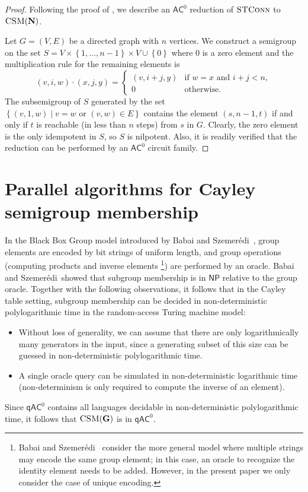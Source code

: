 \documentclass{toc}
\newcommand{\union}{\mathbin{\cup}}
\newcommand{\set}[2]{\ensuremath{\left\{#1 \mid #2\right\}}}
\newcommand{\os}[1]{\ensuremath{\left\{#1\right\}}}
\newcommand{\AC}{\ensuremath{\mathsf{AC}}}
\newcommand{\qAC}{\ensuremath{\mathsf{qAC}}}
\newcommand{\NP}{\ensuremath{\mathsf{NP}}}
\newcommand{\vNil}{\mathbf{N}}
\newcommand{\vG}{\mathbf{G}}
\newcommand{\CSM}{\ensuremath{\textsc{CSM}}}
\newcommand{\STCONN}{\ensuremath{\textsc{STConn}}}
\newcommand{\SCSM}{Cayley semigroup membership}
\newcommand{\Szemeredi}{Szemer{\'e}di}
\begin{document}
\begin{proof}
  Following the proof of , we describe an $\AC^0$
  reduction of $\STCONN$ to $\CSM(\vNil)$.

  Let $G = (V, E)$ be a directed graph with $n$ vertices.
  We construct a semigroup on the set $S = V \times \os{1, \dots, n-1} \times V
  \union \os{0}$ where $0$ is a zero element and the multiplication rule for
  the remaining elements is
  \begin{equation*}
    (v, i, w) \cdot (x, j, y) =
    \begin{cases}
      (v, i + j, y) & \text{if $w = x$ and $i + j < n$}, \\
      0 & \text{otherwise}.
    \end{cases}
  \end{equation*}
  The subsemigroup of $S$ generated by the set $\set{(v, 1, w)}{v = w
  \text{~or~} (v, w) \in E}$ contains the element $(s, n-1, t)$ if and only if
  $t$ is reachable (in less than $n$ steps) from $s$ in $G$.
  Clearly, the zero element is the only idempotent in $S$, so $S$ is nilpotent.
  Also, it is readily verified that the reduction can be performed by an
  $\AC^0$ circuit family.
\end{proof}

%
\section{Parallel algorithms for {\SCSM}}  %
\label{sec:parallel-alg}

In the Black Box Group model introduced by Babai and
\Szemeredi~\cite{BabaiS84}, %
group elements  %
are encoded by
%
bit strings of uniform length,  %
and group
operations (computing products and inverse elements%
%
\footnote{Babai and \Szemeredi~\cite{BabaiS84} consider the more general
model where multiple strings may encode the same group
element; in this case, an oracle to recognize the identity
element needs to be added.  However, in the present paper we only
consider the case of unique encoding.})  %
are performed by an
oracle. Babai and \Szemeredi\ showed that subgroup membership
is in $\NP$ relative to the group oracle.
%
Together with the following observations, it follows that in the Cayley table
setting, subgroup membership can be decided in non-deterministic
polylogarithmic time in the random-access Turing machine model:
%
\begin{itemize}
  \item Without loss of generality, we can assume that there are only
    logarithmically many generators in the input, since a generating subset
    of this size can be guessed in non-deterministic polylogarithmic time.
    
  \item A single oracle query can be simulated in non-deterministic logarithmic
    time (non-determinism is only required to compute the inverse of an
    element).
\end{itemize}
%
Since $\qAC^0$ contains all languages decidable in non-deterministic
polylogarithmic time, it follows that $\CSM(\vG)$ is in $\qAC^0$.
\end{document}
